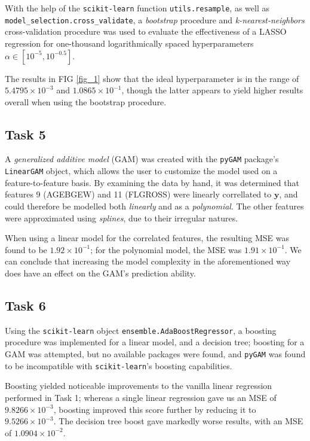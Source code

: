 \documentclass[twoside,twocolumn,10pt]{revtex4-1}
\begin{document}
	With the help of the \texttt{scikit-learn} function \texttt{utils.resample}, as well as \texttt{model\_selection.cross\_validate}, a \textit{bootstrap} procedure and \textit{k-nearest-neighbors} cross-validation procedure was used to evaluate the effectiveness of a LASSO regression for one-thousand logarithmically spaced hyperparameters $\alpha \in [10^{-5}, 10^{-0.5}]$.  
	
	The results in FIG \ref{fig_1} show that the ideal hyperparameter is in the range of $5.4795 \times 10^{-3}$ and $1.0865 \times 10^{-1}$, though the latter appears to yield higher results overall when using the bootstrap procedure.
	
	\subsection*{Task 5}
	
	 A \textit{generalized additive model} (GAM) was created with the \texttt{pyGAM} package's \texttt{LinearGAM} object, which allows the user to customize the model used on a feature-to-feature basis.  By examining the data by hand, it was determined that features 9 (AGEBGEW) and 11 (FLGROSS) were linearly correllated to $\mathbf{y}$, and could therefore be modelled both \textit{linearly} and as a \textit{polynomial}.  The other features were approximated using \textit{splines}, due to their irregular natures.
	 
	 When using a linear model for the correlated features, the resulting MSE was found to be $1.92 \times 10^{-1}$; for the polynomial model, the MSE was $1.91 \times 10^{-1}$. We can conclude that increasing the model complexity in the aforementioned way does have an effect on the GAM's prediction ability.
	 
	 \subsection*{Task 6}
	 
	 Using the \texttt{scikit-learn} object \texttt{ensemble.AdaBoostRegressor}, a boosting procedure was implemented for a linear model, and a decision tree; boosting for a GAM was attempted, but no available packages were found, and \texttt{pyGAM} was found to be incompatible with \texttt{scikit-learn}'s boosting capabilities.
	 
	 Boosting yielded noticeable improvements to the vanilla linear regression performed in Task 1; whereas a single linear regression gave us an MSE of $9.8266 \times 10^{-3}$, boosting improved this score further by reducing it to $9.5266 \times 10^{-3}$.  The decision tree boost gave markedly worse results, with an MSE of $1.0904 \times 10^{-2}$.
\end{document}
